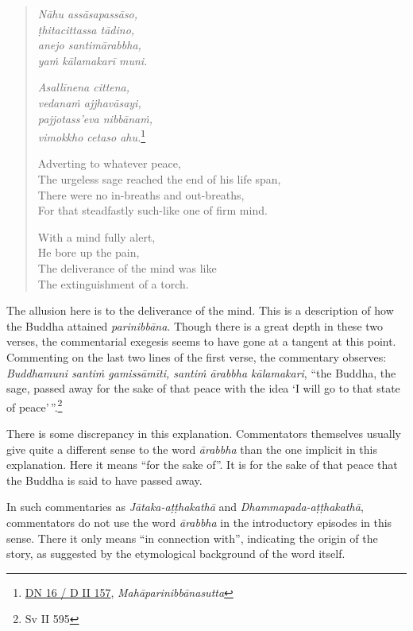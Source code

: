 \begin{quote}
\emph{Nāhu assāsapassāso,}\\
\emph{ṭhitacittassa tādino,}\\
\emph{anejo santimārabbha,}\\
\emph{yaṁ kālamakarī muni.}

\emph{Asallīnena cittena,}\\
\emph{vedanaṁ ajjhavāsayi,}\\
\emph{pajjotass'eva nibbānaṁ,}\\
\emph{vimokkho cetaso ahu.}\footnote{\href{https://suttacentral.net/dn16/pli/ms}{DN 16 / D II 157}, \emph{Mahāparinibbānasutta}}

Adverting to whatever peace,\\
The urgeless sage reached the end of his life span,\\
There were no in-breaths and out-breaths,\\
For that steadfastly such-like one of firm mind.

With a mind fully alert,\\
He bore up the pain,\\
The deliverance of the mind was like\\
The extinguishment of a torch.
\end{quote}

The allusion here is to the deliverance of the mind. This is a description of how the Buddha attained \emph{parinibbāna}. Though there is a great depth in these two verses, the commentarial exegesis seems to have gone at a tangent at this point. Commenting on the last two lines of the first verse, the commentary observes: \emph{Buddhamuni santiṁ gamissāmīti, santiṁ ārabbha kālamakari}, ``the Buddha, the sage, passed away for the sake of that peace with the idea `I will go to that state of peace'\,''.\footnote{Sv II 595}

There is some discrepancy in this explanation. Commentators themselves usually give quite a different sense to the word \emph{ārabbha} than the one implicit in this explanation. Here it means ``for the sake of''. It is for the sake of that peace that the Buddha is said to have passed away.

In such commentaries as \emph{Jātaka-aṭṭhakathā} and \emph{Dhammapada-aṭṭhakathā}, commentators do not use the word \emph{ārabbha} in the introductory episodes in this sense. There it only means ``in connection with'', indicating the origin of the story, as suggested by the etymological background of the word itself.

